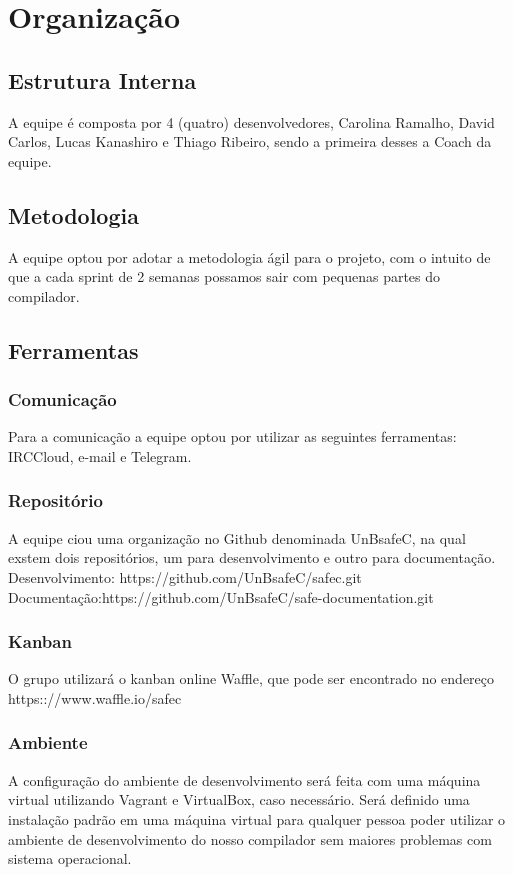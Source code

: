 \chapter[Organização]{Organização}
\section{Estrutura Interna}
A equipe é composta por 4 (quatro) desenvolvedores, Carolina Ramalho, David Carlos, Lucas Kanashiro e Thiago Ribeiro, sendo a primeira desses a Coach da equipe.

\section{Metodologia}
A equipe optou por adotar a metodologia ágil para o projeto, com o intuito de que a cada sprint de 2 semanas possamos sair com pequenas partes do compilador.

\section{Ferramentas}
\subsection{Comunicação}
Para a comunicação a equipe optou por utilizar as seguintes ferramentas: IRCCloud, e-mail e Telegram.
\subsection{Repositório}
A equipe ciou uma organização no Github denominada UnBsafeC, na qual exstem dois repositórios, um para desenvolvimento e outro para documentação.
Desenvolvimento: https://github.com/UnBsafeC/safec.git
Documentação:https://github.com/UnBsafeC/safe-documentation.git
\subsection{Kanban}
O grupo utilizará o kanban online Waffle, que pode ser encontrado no endereço https:://www.waffle.io/safec
\subsection{Ambiente}
A configuração do ambiente de desenvolvimento será feita com uma máquina virtual utilizando Vagrant e VirtualBox, caso necessário. Será definido uma instalação padrão em uma máquina virtual para qualquer pessoa poder utilizar o ambiente de desenvolvimento do nosso compilador sem maiores problemas com sistema operacional.
